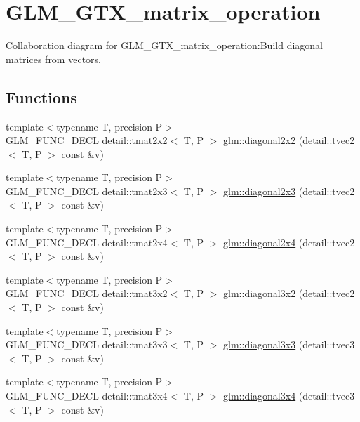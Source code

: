 \hypertarget{group__gtx__matrix__operation}{
\section{GLM\_\-GTX\_\-matrix\_\-operation}
\label{group__gtx__matrix__operation}
}


Collaboration diagram for GLM\_\-GTX\_\-matrix\_\-operation:Build diagonal matrices from vectors.  
\subsection*{Functions}
\begin{CompactItemize}
\item 
{\footnotesize template$<$typename T, precision P$>$ }\\GLM\_\-FUNC\_\-DECL detail::tmat2x2$<$ T, P $>$ \hyperlink{group__gtx__matrix__operation_g8f6e3292b609cd9d959446d808ca3746}{glm::diagonal2x2} (detail::tvec2$<$ T, P $>$ const \&v)
\item 
{\footnotesize template$<$typename T, precision P$>$ }\\GLM\_\-FUNC\_\-DECL detail::tmat2x3$<$ T, P $>$ \hyperlink{group__gtx__matrix__operation_g1d2984ab67cc886c70b1c4993c953d09}{glm::diagonal2x3} (detail::tvec2$<$ T, P $>$ const \&v)
\item 
{\footnotesize template$<$typename T, precision P$>$ }\\GLM\_\-FUNC\_\-DECL detail::tmat2x4$<$ T, P $>$ \hyperlink{group__gtx__matrix__operation_gfba1800a8c3e19da77cb4cd4f1bd72e6}{glm::diagonal2x4} (detail::tvec2$<$ T, P $>$ const \&v)
\item 
{\footnotesize template$<$typename T, precision P$>$ }\\GLM\_\-FUNC\_\-DECL detail::tmat3x2$<$ T, P $>$ \hyperlink{group__gtx__matrix__operation_g91808d304a0220c4e4c68e477ffa2fd2}{glm::diagonal3x2} (detail::tvec2$<$ T, P $>$ const \&v)
\item 
{\footnotesize template$<$typename T, precision P$>$ }\\GLM\_\-FUNC\_\-DECL detail::tmat3x3$<$ T, P $>$ \hyperlink{group__gtx__matrix__operation_g6cc2ba1eff14f0548370fe4df925975c}{glm::diagonal3x3} (detail::tvec3$<$ T, P $>$ const \&v)
\item 
{\footnotesize template$<$typename T, precision P$>$ }\\GLM\_\-FUNC\_\-DECL detail::tmat3x4$<$ T, P $>$ \hyperlink{group__gtx__matrix__operation_g57adf8191f7e67838ee97d9f366fef16}{glm::diagonal3x4} (detail::tvec3$<$ T, P $>$ const \&v)

\end{CompactItemize}
